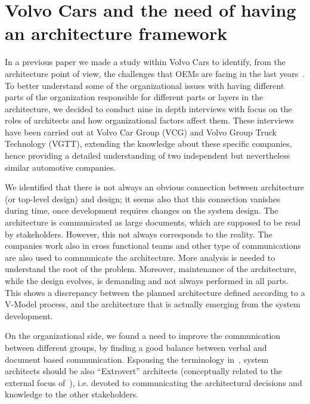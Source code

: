 \section{Volvo Cars and the need of having an architecture framework}\label{sec:lessonsLearned}

In a previous paper we made a study within Volvo Cars to identify, from the architecture point of view, the challenges that OEMs are facing in the last years~\cite{WICSA2015}. 
To better understand some of the
organizational issues with having different parts of the organization responsible for different parts or layers in the architecture, we decided to conduct nine in depth interviews with
focus on the roles of architects and how organizational factors affect them.
These interviews have been carried out at Volvo Car Group (VCG) and Volvo Group Truck Technology
(VGTT), extending the knowledge about these specific companies, hence providing a detailed understanding of two independent but nevertheless similar automotive companies. %


We identified that there is not always an obvious connection between  
architecture (or top-level design) and  design; it seems also that this connection vanishes during time, once development requires changes on the system design. %
The architecture is communicated as large documents,
which are supposed to be read by stakeholders. However, this not always corresponds to the reality. The companies work also in cross functional teams and other type of communications are also used to communicate the architecture. More analysis is needed to understand the root of the problem. 
Moreover, maintenance of the
architecture, while the design evolves, is demanding and not
always performed in all parts. 
This shows a discrepancy between the planned architecture defined according to a V-Model process, and the architecture that is actually emerging from the system development. 

On the organizational side, we found a need to improve the communication between
different groups, by finding a good balance between verbal and document based communication. 
Espousing the terminology
in~\cite{IEEESoftwarePatrizio}, system architects should be also
``Extrovert'' architects (conceptually related to the external focus
of~\cite{Kruchten2008}), i.e. devoted to communicating the architectural
decisions and knowledge to the other stakeholders. 

